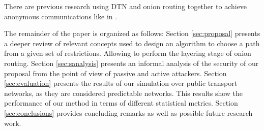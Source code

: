 There are previous research using DTN and onion routing together to achieve anonymous communications like in \cite{arden}.  

The remainder of the paper is organized as follows: Section \ref{sec:proposal} presents a deeper review of relevant concepts used to design an algorithm to choose a path from a given set of restrictions. Allowing to perform the layering stage of onion routing. Section \ref{sec:sanalysis} presents an informal analysis of the security of our proposal from the point of view of passive and active attackers. Section \ref{sec:evaluation} presents the results of our simulation over public transport networks, as they are considered predictable networks. This results show the performance of our method in terms of different statistical metrics. Section \ref{sec:conclusions} provides concluding remarks as well as possible future research work.